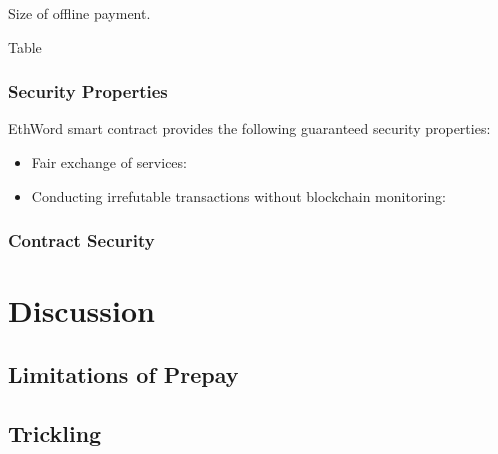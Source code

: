 Size of offline payment.

Table

\subsubsection{Security Properties}

EthWord smart contract provides the following guaranteed security properties:
\begin{itemize}
	\item Fair exchange of services:
	\item Conducting irrefutable transactions without blockchain monitoring:
\end{itemize}

\subsubsection{Contract Security}



\section{Discussion}

\subsection{Limitations of Prepay} 

\subsection{Trickling} 













